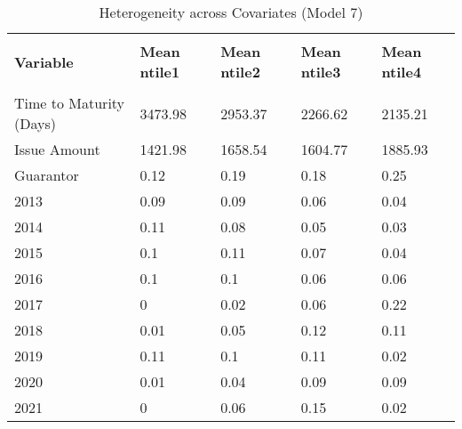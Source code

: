 \begin{table}[H]
\caption{Heterogeneity across Covariates (Model 7)}
\label{Het}
\footnotesize
\begin{tabular}{lllll}
\\[-1.8ex]\hline 
\hline \\[-1.8ex] 
{\color[HTML]{333333} \textbf{Variable}} & {\color[HTML]{333333} \textbf{Mean ntile1}} & {\color[HTML]{333333} \textbf{Mean ntile2}} & {\color[HTML]{333333} \textbf{Mean ntile3}} & {\color[HTML]{333333} \textbf{Mean ntile4}} \\
\hline \\[-1.8ex] 
Time to   Maturity (Days) & \cellcolor[HTML]{63BE7B}3473.98 & \cellcolor[HTML]{9FD7AF}2953.37 & \cellcolor[HTML]{EDF6F3}2266.62 & \cellcolor[HTML]{FCFCFF}2135.21 \\
Issue Amount & \cellcolor[HTML]{FCFCFF}1421.98 & \cellcolor[HTML]{AEDDBC}1658.54 & \cellcolor[HTML]{C0E4CB}1604.77 & \cellcolor[HTML]{63BE7B}1885.93 \\
Guarantor & \cellcolor[HTML]{E7F4ED}0.12 & \cellcolor[HTML]{DAEFE2}0.19 & \cellcolor[HTML]{DCEFE4}0.18 & \cellcolor[HTML]{CFEAD9}0.25 \\
2013 & \cellcolor[HTML]{ECF6F2}0.09 & \cellcolor[HTML]{ECF6F2}0.09 & \cellcolor[HTML]{F2F8F6}0.06 & \cellcolor[HTML]{F5FAF9}0.04 \\
2014 & \cellcolor[HTML]{E9F4EE}0.11 & \cellcolor[HTML]{EEF7F3}0.08 & \cellcolor[HTML]{F3F9F8}0.05 & \cellcolor[HTML]{F7FAFB}0.03 \\
2015 & \cellcolor[HTML]{EAF5F0}0.1 & \cellcolor[HTML]{E9F4EE}0.11 & \cellcolor[HTML]{F0F7F5}0.07 & \cellcolor[HTML]{F5FAF9}0.04 \\
2016 & \cellcolor[HTML]{EAF5F0}0.1 & \cellcolor[HTML]{EAF5F0}0.1 & \cellcolor[HTML]{F2F8F6}0.06 & \cellcolor[HTML]{F2F8F6}0.06 \\
2017 & \cellcolor[HTML]{FCFCFF}0 & \cellcolor[HTML]{F9FBFC}0.02 & \cellcolor[HTML]{F2F8F6}0.06 & \cellcolor[HTML]{D5ECDD}0.22 \\
2018 & \cellcolor[HTML]{FBFCFE}0.01 & \cellcolor[HTML]{F3F9F8}0.05 & \cellcolor[HTML]{E7F4ED}0.12 & \cellcolor[HTML]{E9F4EE}0.11 \\
2019 & \cellcolor[HTML]{E9F4EE}0.11 & \cellcolor[HTML]{EAF5F0}0.1 & \cellcolor[HTML]{E9F4EE}0.11 & \cellcolor[HTML]{F9FBFC}0.02 \\
2020 & \cellcolor[HTML]{FBFCFE}0.01 & \cellcolor[HTML]{F5FAF9}0.04 & \cellcolor[HTML]{ECF6F2}0.09 & \cellcolor[HTML]{ECF6F2}0.09 \\
2021 & \cellcolor[HTML]{FCFCFF}0 & \cellcolor[HTML]{F2F8F6}0.06 & \cellcolor[HTML]{E1F2E8}0.15 & \cellcolor[HTML]{F9FBFC}0.02 \\

\end{tabular}
\end{table}
